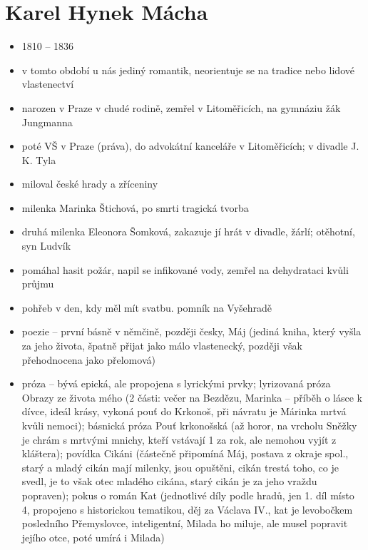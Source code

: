 \documentclass{article}
\begin{document}
\section{Karel Hynek Mácha}
\begin{itemize}
  \item 1810 -- 1836
  \item v tomto období u nás jediný romantik, neorientuje se na tradice nebo lidové vlastenectví
  \item narozen v Praze v chudé rodině, zemřel v Litoměřicích, na gymnáziu žák Jungmanna
  \item poté VŠ v Praze (práva), do advokátní kanceláře v Litoměřicích; v divadle J. K. Tyla
  \item miloval české hrady a zříceniny
  \item milenka Marinka Štichová, po smrti tragická tvorba
  \item druhá milenka Eleonora Šomková, zakazuje jí hrát v divadle, žárlí; otěhotní, syn Ludvík
  \item pomáhal hasit požár, napil se infikované vody, zemřel na dehydrataci kvůli průjmu
  \item pohřeb v den, kdy měl mít svatbu. pomník na Vyšehradě
  \item poezie -- první básně v němčině, později česky, Máj (jediná kniha, který vyšla za jeho života, špatně přijat jako málo vlastenecký, později však přehodnocena jako přelomová)
  \item próza -- bývá epická, ale propojena s lyrickými prvky; lyrizovaná próza Obrazy ze života mého (2 části: večer na Bezdězu, Marinka – příběh o lásce k dívce, ideál krásy, vykoná pouť do Krkonoš, při návratu je Márinka mrtvá kvůli nemoci); básnická próza Pouť krkonošská (až horor, na vrcholu Sněžky je chrám s mrtvými mnichy, kteří vstávají 1 za rok, ale nemohou vyjít z kláštera); povídka Cikáni (částečně připomíná Máj, postava z okraje spol., starý a mladý cikán mají milenky, jsou opuštěni, cikán trestá toho, co je svedl, je to však otec mladého cikána, starý cikán je za jeho vraždu popraven); pokus o román Kat (jednotlivé díly podle hradů, jen 1. díl místo 4, propojeno s historickou tematikou, děj za Václava IV., kat je levobočkem posledního Přemyslovce, inteligentní, Milada ho miluje, ale musel popravit jejího otce, poté umírá i Milada)
\end{itemize}
\end{document}
